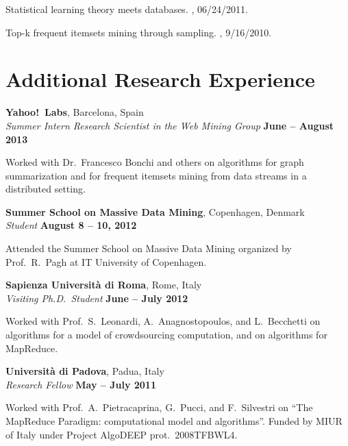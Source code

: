 \documentclass[margin,line]{resume}
\begin{document}
Statistical learning theory meets databases.
, 06/24/2011.

Top-k frequent itemsets mining through sampling.
, 9/16/2010.


\section{\sc Additional Research Experience}
{\bf Yahoo!~Labs}, Barcelona, Spain \\
{\em Summer Intern Research Scientist in the Web Mining Group} \hfill {\bf June -- August 2013}

\begin{list2}
\vspace*{.05in}
\item Worked with Dr.~Francesco Bonchi and others on algorithms for graph
  summarization and for frequent itemsets mining from data streams in a
  distributed setting.
\end{list2}

{\bf Summer School on Massive Data Mining}, Copenhagen, Denmark \\
{\em Student} \hfill {\bf August 8 -- 10, 2012}

\begin{list2}
  \vspace*{.05in}
\item Attended the Summer School on Massive Data Mining organized by
  Prof.~R.~Pagh at IT University of Copenhagen.
\end{list2}

{\bf Sapienza Universit\`a di Roma}, Rome, Italy\\
{\em Visiting Ph.D.~Student} \hfill {\bf June -- July 2012}

\begin{list2}
\vspace*{.05in}
\item Worked with Prof.~S.~Leonardi, A.~Anagnostopoulos, and L.~Becchetti on
  algorithms for a model of crowdsourcing computation, and on algorithms for
  MapReduce.
\end{list2}

{\bf Universit\`a di Padova}, Padua, Italy\\
{\em Research Fellow} \hfill {\bf May -- July 2011}

\begin{list2}
\vspace*{.05in}
\item Worked with Prof.~A.~Pietracaprina, G.~Pucci, and F.~Silvestri on ``The MapReduce Paradigm:
computational model and algorithms''. Funded by MIUR of Italy under Project AlgoDEEP prot.~2008TFBWL4.
\end{list2}
\end{document}
